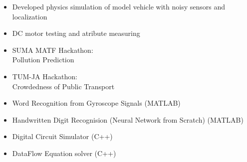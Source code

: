 \begin{itemize}
    \item   \small{Developed physics simulation of model vehicle with noisy sensors and localization}
    \item   \small{DC motor testing and atribute measuring} \\
\end{itemize}


    \begin{itemize}
        \item SUMA MATF Hackathon: \\Pollution Prediction
        \href{https://github.com/basicskill/matf-hackathon}{}
        \item TUM-JA Hackathon: \\Crowdedness of Public Transport
        \href{https://github.com/basicskill/tum-hackathon}{}
    \end{itemize}

    \begin{itemize}
        \item Word Recognition from Gyroscope Signals (MATLAB)
        \item Handwritten Digit Recognision (Neural Network from Scratch) (MATLAB)
        \item Digital Circuit Simulator (C++)
        \item DataFlow Equation solver (C++)
    \end{itemize}

    
    
